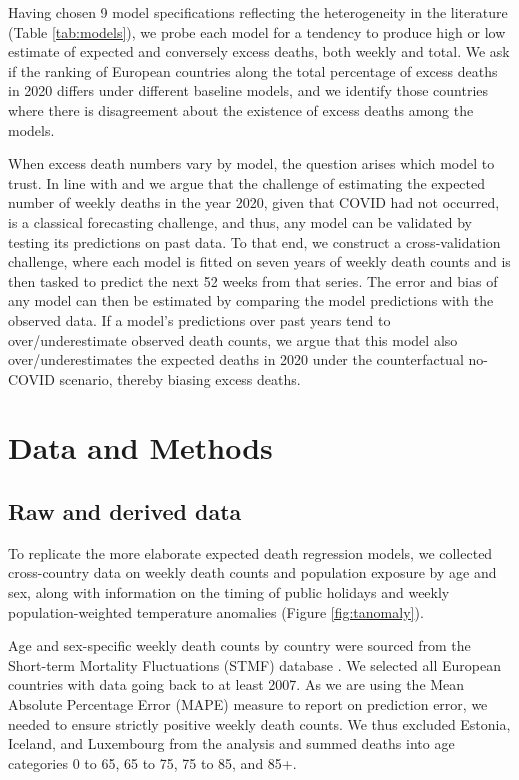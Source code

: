 \documentclass[12pt]{article}
\begin{document}
Having chosen 9 model specifications reflecting the heterogeneity in the literature (Table \ref{tab:models}), we probe each model for a tendency to produce high or low estimate of expected and conversely excess deaths, both weekly and total. We ask if the ranking of European countries along the total percentage of excess deaths in 2020 differs under different baseline models, and we identify those countries where there is disagreement about the existence of excess deaths among the models.

When excess death numbers vary by model, the question arises which model to trust. In line with \cite{Kontis2020} and \cite{Modi2020} we argue that the challenge of estimating the expected number of weekly deaths in the year 2020, given that COVID had not occurred, is a classical forecasting challenge, and thus, any model can be validated by testing its predictions on past data. To that end, we construct a cross-validation challenge, where each model is fitted on seven years of weekly death counts and is then tasked to predict the next 52 weeks from that series. The error and bias of any model can then be estimated by comparing the model predictions with the observed data. If a model's predictions over past years tend to over/underestimate observed death counts, we argue that this model also over/underestimates the expected deaths in 2020 under the counterfactual no-COVID scenario, thereby biasing excess deaths.

\section*{Data and Methods}

\subsection*{Raw and derived data}

To replicate the more elaborate expected death regression models, we collected cross-country data on weekly death counts and population exposure by age and sex, along with information on the timing of public holidays and weekly population-weighted temperature anomalies (Figure \ref{fig:tanomaly}).


Age and sex-specific weekly death counts by country were sourced from the Short-term Mortality Fluctuations (STMF) database \citep{Jdanov2021, Nemeth2021}. We selected all European countries with data going back to at least 2007. As we are using the Mean Absolute Percentage Error (MAPE) measure to report on prediction error, we needed to ensure strictly positive weekly death counts. We thus excluded Estonia, Iceland, and Luxembourg from the analysis and summed deaths into age categories 0 to 65, 65 to 75, 75 to 85, and 85+.
\end{document}
